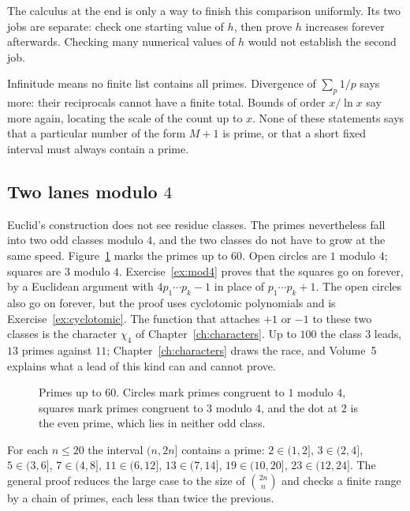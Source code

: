 The calculus at the end is only a way to finish this comparison uniformly. Its two jobs are separate: check one starting value of $h$, then prove $h$ increases forever afterwards. Checking many numerical values of $h$ would not establish the second job.

\begin{reminder}
Infinitude means no finite list contains all primes. Divergence of $\sum_p1/p$ says more: their reciprocals cannot have a finite total. Bounds of order $x/\ln x$ say more again, locating the scale of the count up to $x$. None of these statements says that a particular number of the form $M+1$ is prime, or that a short fixed interval must always contain a prime.
\end{reminder}

\subsection*{Two lanes modulo $4$}
Euclid's construction does not see residue classes. The primes nevertheless fall into two odd classes modulo $4$, and the two classes do not have to grow at the same speed. Figure~\ref{fig:mod4-line} marks the primes up to $60$. Open circles are $1$ modulo $4$; squares are $3$ modulo $4$. Exercise~\ref{ex:mod4} proves that the squares go on forever, by a Euclidean argument with $4p_1\cdots p_k-1$ in place of $p_1\cdots p_k+1$. The open circles also go on forever, but the proof uses cyclotomic polynomials and is Exercise~\ref{ex:cyclotomic}. The function that attaches $+1$ or $-1$ to these two classes is the character $\chi_4$ of Chapter~\ref{ch:characters}. Up to $100$ the class $3$ leads, $13$ primes against $11$; Chapter~\ref{ch:characters} draws the race, and Volume~5 explains what a lead of this kind can and cannot prove.

\begin{figure}[ht]
\centering
{}
\caption{Primes up to $60$. Circles mark primes congruent to $1$ modulo $4$, squares mark primes congruent to $3$ modulo $4$, and the dot at $2$ is the even prime, which lies in neither odd class.}
\label{fig:mod4-line}
\end{figure}

\begin{examplex}
For each $n\le 20$ the interval $(n,2n]$ contains a prime: $2\in(1,2]$, $3\in(2,4]$, $5\in(3,6]$, $7\in(4,8]$, $11\in(6,12]$, $13\in(7,14]$, $19\in(10,20]$, $23\in(12,24]$. The general proof reduces the large case to the size of $\binom{2n}{n}$ and checks a finite range by a chain of primes, each less than twice the previous.
\end{examplex}

